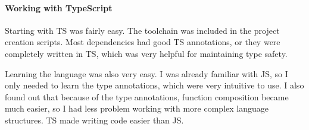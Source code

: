 \paragraph{Working with TypeScript}\label{sec:working-with-typescript}

Starting with \acl{TS} was fairly easy.
The toolchain was included in the project creation scripts.
Most dependencies had good \acl{TS} annotations,
or they were completely written in \acl{TS},
which was very helpful for maintaining type safety.

Learning the language was also very easy.
I was already familiar with \acl{JS},
so I only needed to learn the type annotations,
which were very intuitive to use.
I also found out that because of the type annotations,
function composition became much easier,
so I had less problem working with more complex
language structures.
\Acl{TS} made writing code easier than \acl{JS}.
